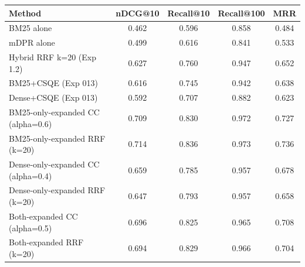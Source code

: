 \begin{tabular}{lcccc}
\toprule
Method & nDCG@10 & Recall@10 & Recall@100 & MRR \\
\midrule
BM25 alone & 0.462 & 0.596 & 0.858 & 0.484 \\
mDPR alone & 0.499 & 0.616 & 0.841 & 0.533 \\
Hybrid RRF k=20 (Exp 1.2) & 0.627 & 0.760 & 0.947 & 0.652 \\
BM25+CSQE (Exp 013) & 0.616 & 0.745 & 0.942 & 0.638 \\
Dense+CSQE (Exp 013) & 0.592 & 0.707 & 0.882 & 0.623 \\
BM25-only-expanded CC (alpha=0.6) & 0.709 & 0.830 & 0.972 & 0.727 \\
BM25-only-expanded RRF (k=20) & 0.714 & 0.836 & 0.973 & 0.736 \\
Dense-only-expanded CC (alpha=0.4) & 0.659 & 0.785 & 0.957 & 0.678 \\
Dense-only-expanded RRF (k=20) & 0.647 & 0.793 & 0.957 & 0.658 \\
Both-expanded CC (alpha=0.5) & 0.696 & 0.825 & 0.965 & 0.708 \\
Both-expanded RRF (k=20) & 0.694 & 0.829 & 0.966 & 0.704 \\
\bottomrule
\end{tabular}
